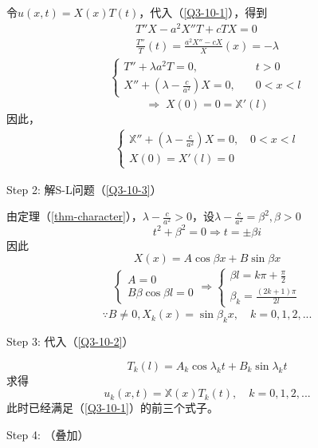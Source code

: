 \documentclass[11pt, a4paper]{article}
\theoremstyle{theorem}
\begin{document}
    令$u(x,t) = X(x)T(t)$，代入（\ref{Q3-10-1}），得到
    \begin{align*}
        T''X - a^2 X'' T + c TX = 0 \\
        \frac{T''}{T}(t) = \frac{a^2 X'' - cX}{X}(x) = - \lambda
    \end{align*}
    \begin{align}
    \label{Q3-10-2}
        \begin{cases}
        T'' + \lambda a^2 T = 0, \quad &t > 0 \\
        X'' + (\lambda - \frac{c}{a^2})X = 0, \quad &0 < x < l
        \end{cases}
    \end{align}
    $$
    \Rightarrow \; X(0) = 0 = \mathbb{X}'(l)
    $$
    因此，
    \begin{align}
    \label{Q3-10-3}
        \begin{cases}
        \mathbb{X}'' + (\lambda - \frac{c}{a^2}) X  = 0, \quad 0 < x < l \\
        X(0) = X'(l) = 0
        \end{cases}
    \end{align}

    Step 2: 解S-L问题（\ref{Q3-10-3}）

    由定理（\ref{thm-character}），$\lambda - \frac{c}{a^2} > 0$，设$\lambda - \frac{c}{a^2} = \beta^2, \beta > 0$
    $$
   t^2 + \beta^2 = 0 \Rightarrow t = \pm \beta i
    $$
    因此
    $$
    X(x) = A \cos \beta x + B \sin \beta x
    $$
    \begin{align*}
        \begin{cases}
            A = 0 \\
            B \beta \cos \beta l = 0
        \end{cases} \Rightarrow
        \begin{cases}
        \beta l = k \pi + \frac{\pi}{2} \\
        \beta_k = \frac{(2k+1)\pi}{2l}
        \end{cases}
    \end{align*}
    $$
    \because B \neq 0, X_k(x) = \sin \beta_k x, \quad k = 0,1,2,...
    $$

    Step 3: 代入（\ref{Q3-10-2}）

    $$
    T_k(l) = A_k \cos \lambda_k t + B_k \sin \lambda_k t
    $$
    求得
    $$
    u_k(x,t) = \mathbb{X}(x) T_k(t), \quad k = 0,1,2,...
    $$
    此时已经满足（\ref{Q3-10-1}）的前三个式子。

    Step 4: （叠加）
\end{document}
